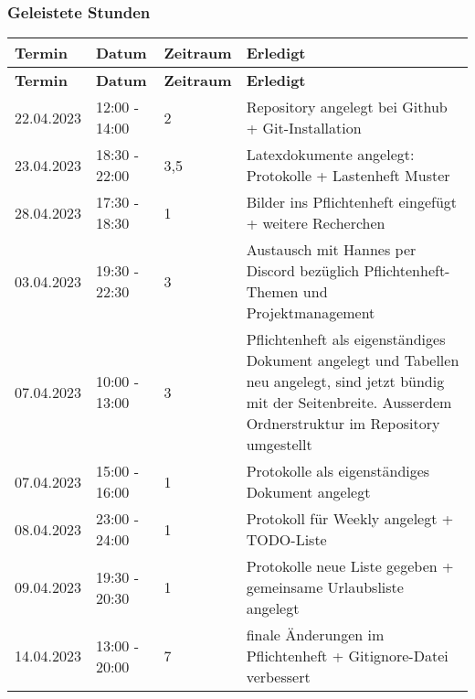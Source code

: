 \subsubsection{Geleistete Stunden}
\begin{flushleft}
		\begin{longtable}{p{2cm}p{}p{2cm}p{}}
            \toprule
            \textbf{Termin} & \textbf{Datum} & \textbf{Zeitraum} & \textbf{Erledigt}\\
            \midrule\endfirsthead
            \toprule
            \textbf{Termin} & \textbf{Datum} & \textbf{Zeitraum} & \textbf{Erledigt}\\
            \midrule\endhead
            	22.04.2023 & 12:00 - 14:00 & 2 & Repository angelegt bei Github +  Git-Installation\\ \midrule
    			23.04.2023 & 18:30 - 22:00 & 3,5 & Latexdokumente angelegt: Protokolle + Lastenheft Muster \\ \midrule
			    28.04.2023 & 17:30 - 18:30 & 1 & Bilder ins Pflichtenheft eingefügt + weitere Recherchen\\ \midrule
				03.04.2023 & 19:30 - 22:30 & 3 & Austausch mit Hannes per Discord bezüglich Pflichtenheft-Themen und Projektmanagement\\ \midrule
				07.04.2023 & 10:00 - 13:00 & 3 & Pflichtenheft als eigenständiges Dokument angelegt und Tabellen neu angelegt, sind jetzt bündig mit der Seitenbreite. Ausserdem Ordnerstruktur im Repository umgestellt\\ \midrule
				07.04.2023 & 15:00 - 16:00 & 1 & Protokolle als eigenständiges Dokument angelegt \\ \midrule
				08.04.2023 & 23:00 - 24:00 & 1 & Protokoll für Weekly angelegt + TODO-Liste \\ \midrule
				09.04.2023 & 19:30 - 20:30 & 1 & Protokolle neue Liste gegeben + gemeinsame Urlaubsliste angelegt \\ \midrule
				14.04.2023 & 13:00 - 20:00 & 7 & finale Änderungen im Pflichtenheft + Gitignore-Datei verbessert \\ 
            \bottomrule
    \end{longtable}
\end{flushleft}